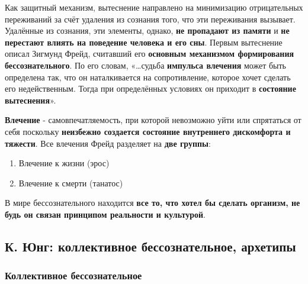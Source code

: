 \documentclass{article}
\begin{document}
\begin{flushleft}
Как защитный механизм, вытеснение направлено на минимизацию отрицательных переживаний за счёт удаления из сознания того, что эти переживания вызывает. Удалённые из сознания, эти элементы, однако, \textbf{не пропадают из памяти} и \textbf{не перестают влиять на поведение человека и его сны}. Первым вытеснение описал Зигмунд Фрейд, считавший его \textbf{основным механизмом формирования бессознательного}. По его словам, «…судьба \textbf{импульса влечения} может быть определена так, что он наталкивается на сопротивление, которое хочет сделать его недейственным. Тогда при определённых условиях он приходит в \textbf{состояние вытеснения}».

\hfill

\textbf{Влечение} - самовпечатляемость, при которой невозможно уйти или спрятаться от себя поскольку \textbf{неизбежно создается состояние внутреннего дискомфорта и тяжести}. Все влечения Фрейд разделяет на \textbf{две группы}:

\begin{enumerate}
    \item Влечение к жизни (эрос)
    \item Влечение к смерти (танатос)
\end{enumerate}

В мире бессознательного находится \textbf{все то, что хотел бы сделать организм, не будь он связан принципом реальности и культурой}.

\end{flushleft}

\subsection{К. Юнг: коллективное бессознательное, архетипы}

\subsubsection{Коллективное бессознательное}
\end{document}
